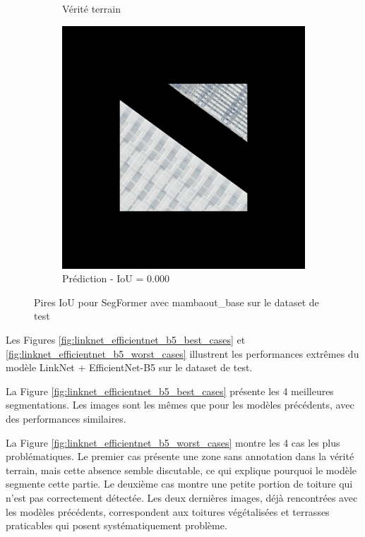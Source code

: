 \begin{figure}[H]
\begin{subfigure}{0.32\textwidth}
    \caption{Vérité terrain}
\end{subfigure}
\hfill
\begin{subfigure}{0.32\textwidth}
    \includegraphics[width=\textwidth]{02-main//figures/ch4/kfold_ensembles/segformer_tu-mambaout_base/worst_cases/worst_1_iou0.000_24931113_tile_19_19_52ccbb_overlay_pred.png}
    \caption{Prédiction - IoU = 0.000}
\end{subfigure}

\caption{Pires IoU pour SegFormer avec mambaout\_base sur le dataset de test}
\label{fig:segformer_mambaoutbase_worst_cases}
\end{figure}


Les Figures \ref{fig:linknet_efficientnet_b5_best_cases} et \ref{fig:linknet_efficientnet_b5_worst_cases} illustrent les performances extrêmes du modèle LinkNet + EfficientNet-B5 sur le dataset de test.

La Figure \ref{fig:linknet_efficientnet_b5_best_cases} présente les 4 meilleures segmentations. Les images sont les mêmes que pour les modèles précédents, avec des performances similaires.

La Figure \ref{fig:linknet_efficientnet_b5_worst_cases} montre les 4 cas les plus problématiques. Le premier cas présente une zone sans annotation dans la vérité terrain, mais cette absence semble discutable, ce qui explique pourquoi le modèle segmente cette partie. Le deuxième cas montre une petite portion de toiture qui n'est pas correctement détectée. Les deux dernières images, déjà rencontrées avec les modèles précédents, correspondent aux toitures végétalisées et terrasses praticables qui posent systématiquement problème.

